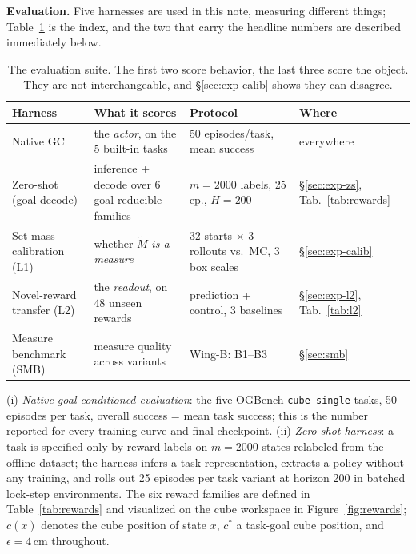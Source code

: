 \documentclass[10pt]{article}
\begin{document}
\textbf{Evaluation.} Five harnesses are used in this note, measuring different
things; Table~\ref{tab:harnesses} is the index, and the two that carry the
headline numbers are described immediately below.

\begin{table}[h]
\centering\footnotesize
\setlength{\tabcolsep}{4pt}
\renewcommand{\arraystretch}{1.2}
\begin{tabular}{l p{3.5cm} p{3.4cm} l}
\toprule
\textbf{Harness} & \textbf{What it scores} & \textbf{Protocol} & \textbf{Where} \\
\midrule
Native GC & the \emph{actor}, on the 5 built-in tasks & 50 episodes/task, mean success & everywhere \\
Zero-shot (goal-decode) & inference {+} decode over 6 goal-reducible families & $m{=}2000$ labels, 25 ep., $H{=}200$ & \S\ref{sec:exp-zs}, Tab.~\ref{tab:rewards} \\
Set-mass calibration (L1) & whether $\tilde M$ \emph{is a measure} & 32 starts $\times$ 3 rollouts vs.\ MC, 3 box scales & \S\ref{sec:exp-calib} \\
Novel-reward transfer (L2) & the \emph{readout}, on 48 unseen rewards & prediction {+} control, 3 baselines & \S\ref{sec:exp-l2}, Tab.~\ref{tab:l2} \\
Measure benchmark (SMB) & measure quality across variants & Wing-B: B1--B3 & \S\ref{sec:smb} \\
\bottomrule
\end{tabular}
\caption{The evaluation suite. The first two score behavior, the last three score
the object. They are not interchangeable, and \S\ref{sec:exp-calib} shows they
can disagree.}
\label{tab:harnesses}
\end{table}

(i) \emph{Native goal-conditioned evaluation}: the five OGBench \texttt{cube-single}
tasks, 50 episodes per task, overall success = mean task success; this is the number
reported for every training curve and final checkpoint.
(ii) \emph{Zero-shot harness}: a task is specified only by reward labels on $m{=}2000$
states relabeled from the offline dataset; the harness infers a task representation,
extracts a policy without any training, and rolls out 25 episodes per task variant at
horizon 200 in batched lock-step environments.
The six reward families are defined in Table~\ref{tab:rewards} and visualized on the
cube workspace in Figure~\ref{fig:rewards}; $c(x)$ denotes the cube position of state
$x$, $c^{*}$ a task-goal cube position, and $\epsilon=4$\,cm throughout.
\end{document}
